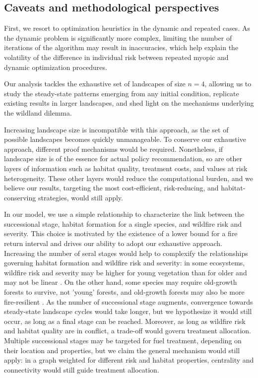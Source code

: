 \subsection{Caveats and methodological perspectives}
\label{section:caveats}

First, we resort to optimization heuristics in the dynamic and repeated cases. As the dynamic problem is significantly more complex, limiting the number of iterations of the algorithm may result in inaccuracies, which help explain the volatility of the difference in individual risk between repeated myopic and dynamic optimization procedures. 

Our analysis tackles the exhaustive set of landscapes of size $n=4$, allowing us to study the steady-state patterns emerging from any initial condition, replicate existing results in larger landscapes, and shed light on the mechanisms underlying the wildland dilemma. 

Increasing landscape size is incompatible with this approach, as the set of possible landscapes becomes quickly unmanageable. To conserve our exhaustive approach, different proof mechanisms would be required. Nonetheless, if landscape size is of the essence for actual policy recommendation, so are other layers of information such as habitat quality, treatment costs, and values at risk heterogeneity. These other layers would reduce the computational burden, and we believe our results, targeting the most cost-efficient, risk-reducing, and habitat-conserving strategies, would still apply. 

In our model, we use a simple relationship to characterize the link between the successional stage, habitat formation for a single species, and wildfire risk and severity. This choice is motivated by the existence of a lower bound for a fire return interval and drives our ability to adopt our exhaustive approach. Increasing the number of seral stages would help to complexify the relationships governing habitat formation and wildfire risk and severity: in some ecosystems, wildfire risk and severity may be higher for young vegetation than for older and may not be linear \citep{Taylor2014}. On the other hand, some species may require old-growth forests to survive, not 'young' forests, and old-growth forests may also be more fire-resilient \citep{lesmeister_northern_2021}. As the number of successional stage augments, convergence towards steady-state landscape cycles would take longer, but we hypothesize it would still occur, as long as a final stage can be reached. Moreover, as long as wildfire risk and habitat quality are in conflict, a trade-off would govern treatment allocation. Multiple successional stages may be targeted for fuel treatment, depending on their location and properties, but we claim the general mechanism would still apply: in a graph weighted for different risk and habitat properties, centrality and connectivity would still guide treatment allocation. 


